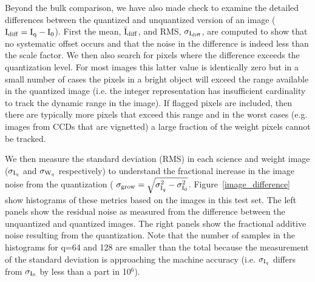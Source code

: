 Beyond the bulk comparison, we have also made check to examine the detailed differences between the 
quantized and unquantized version of an image (${\rm I}_{\rm diff} = {\rm I}_{\rm q}-{\rm I}_{\rm 0}$).  First the mean, 
$\bar{\rm I}_{\rm diff}$, and RMS, $\sigma_{{\rm I}_{\rm diff}}$, are computed to show that no
systematic offset occurs and that the noise in the difference is indeed less than the scale factor.
We then also search for pixels where the difference exceeds the quantization level.  For most images
this latter value is identically zero but in a small number of cases the pixels in a bright object
will exceed the range available in the quantized image (i.e. the integer representation has insufficient
cardinality to track the dynamic range in the image).  If flagged pixels are included, then there 
are typically more pixels that exceed this range and in the worst cases (e.g. images from CCDs that 
are vignetted) a large fraction of the weight pixels cannot be tracked.

We then measure the standard deviation (RMS) in each science and weight image ($\sigma_{{\rm I}_{\rm q}}$ 
and $\sigma_{{\rm W}_{q}}$ respectively) to understand the fractional increase in the image noise
from the quantization ( $\sigma_{\rm grow} = \sqrt{\sigma_{{\rm I}_{q}}^2 - \sigma_{{\rm I}_{0}}^2 }$.  
Figure~\ref{image_difference} show histograms of these metrics based
on the images in this test set.  The left panels show the residual noise as measured from the difference
between the unquantized and quantized images.  The right panels show the fractional additive noise 
resulting from the quantization.  Note that the number of samples in the histograms for q=64 and 128 
are smaller than the total because the measurement of the standard deviation is approaching the machine 
accuracy (i.e.  $\sigma_{{\rm I}_{q}}$ differs from $\sigma_{{\rm I}_{0}}$ by less than a part in 10$^{6}$).

